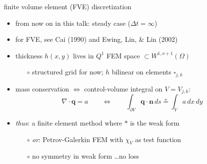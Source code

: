 \documentclass[xcolor={dvipsnames}]{beamer}
\newcommand\bn{\mathbf{n}}
\newcommand\bq{\mathbf{q}}
\newcommand\Div{\nabla\cdot}
\begin{document}
\begin{frame}{finite volume element (FVE) discretization}

\begin{itemize}
\item from now on in this talk: steady case ($\Delta t = \infty$)
\item for FVE, see Cai (1990) and Ewing, Lin, \& Lin (2002)
\item thickness $h(x,y)$ lives in $Q^1$ FEM space $\subset W^{1,\nu+1}(\Omega)$
    \begin{itemize}
    \item[$\circ$] structured grid for now; $h$ bilinear on elements $\square_{j,k}$
    \end{itemize}
\item mass conservation $\iff$ control-volume integral on $V=V_{j,k}$:
    $$\Div \bq = a \qquad \iff \qquad \int_{\partial V} \bq \cdot \bn \,ds \stackrel{\ast}{=} \int_V a \,dx\,dy$$ 
\item \emph{thus}: a finite element method where $\ast$ is the weak form
    \begin{itemize}
    \item[$\circ$] \emph{or}: Petrov-Galerkin FEM with $\chi_V$ as test function
    \item[$\circ$] no symmetry in weak form \dots no loss
    \end{itemize}
\end{itemize}

\begin{center}
\end{center}
\end{frame}
\end{document}
